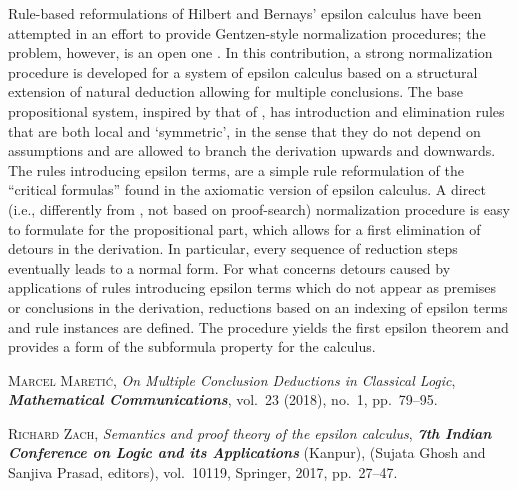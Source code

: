 \documentclass[bsl,meeting]{asl}
\newcommand{\NP}{}
\begin{document}
\thispagestyle{empty}


\NP  
{}



Rule-based reformulations of Hilbert and Bernays' epsilon calculus have been attempted in an effort to provide Gentzen-style normalization procedures; the problem, however, is an open one \cite{Zac17}. In this contribution, a strong normalization procedure is developed for a system of epsilon calculus based on a structural extension of natural deduction allowing for multiple conclusions. The base propositional system, inspired by that of \cite{Mar18}, has introduction and elimination rules that are both local and `symmetric', in the sense that they do not depend on assumptions and are allowed to branch the derivation upwards and downwards. The rules introducing epsilon terms, are a simple rule reformulation of the ``critical formulas'' found in the axiomatic version of epsilon calculus.  A direct (i.e., differently from \cite{Mar18}, not based on proof-search) normalization procedure is easy to formulate for the propositional part, which allows for a first elimination of detours in the derivation. In particular, every sequence of reduction steps eventually leads to a normal form. For what concerns detours caused by applications of rules introducing epsilon terms which do not appear as premises or conclusions in the derivation, reductions based on an indexing of epsilon terms and rule instances are defined. The procedure yields the first epsilon theorem and provides a form of the subformula property for the calculus.

\begin{thebibliography}{10}


{\scshape Marcel Maretić},
{\itshape On Multiple Conclusion Deductions in Classical Logic},
{\bfseries\itshape Mathematical Communications},
vol.~23 (2018), no.~1, pp.~79--95.

{\scshape Richard Zach},
{\itshape Semantics and proof theory of the epsilon calculus},
{\bfseries\itshape 7th Indian Conference on Logic and its Applications}
(Kanpur),
(Sujata Ghosh and Sanjiva Prasad, editors),
vol.~10119,
Springer,
2017,
pp.~27--47.
\end{thebibliography}


\vspace*{-0.5\baselineskip}
\end{document}
